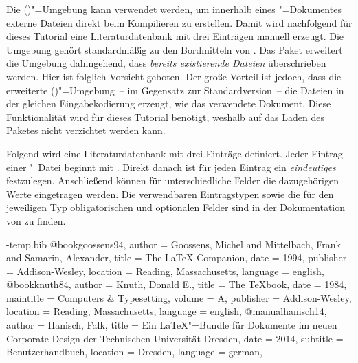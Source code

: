 \documentclass[%
  english,ngerman,%
  cdgeometry=no,DIV=12,automark,%
]{tudscrartcl}
\begin{document}
Die ()"=Umgebung kann verwendet 
werden, um innerhalb eines "=Dokumentes externe Dateien direkt 
beim Kompilieren zu erstellen. Damit wird nachfolgend für dieses Tutorial eine 
Literaturdatenbank  mit drei Einträgen manuell erzeugt. 
Die Umgebung gehört standardmäßig zu den Bordmitteln von . Das 
Paket  erweitert die Umgebung dahingehend, dass 
\emph{bereits existierende Dateien} überschrieben werden. Hier ist folglich 
Vorsicht geboten. Der große Vorteil ist jedoch, dass die erweiterte 
()"=Umgebung~-- im Gegensatz 
zur Standardversion~-- die Dateien in der gleichen Eingabekodierung erzeugt, 
wie das verwendete Dokument. Diese Funktionalität wird für dieses Tutorial 
benötigt, weshalb auf das Laden des Paketes  nicht 
verzichtet werden kann. 
%
\begin{Preamble}
\usepackage{filecontents}
\end{Preamble}
%
Folgend wird eine Literaturdatenbank mit drei Einträge definiert. Jeder Eintrag 
einer "~Datei beginnt mit . Direkt 
danach ist für jeden Eintrag ein \emph{eindeutiges}  
festzulegen. Anschließend können für unterschiedliche Felder die dazugehörigen 
Werte eingetragen werden. Die verwendbaren Eintragstypen sowie die für den 
jeweiligen Typ obligatorischen und optionalen Felder sind in der Dokumentation 
von  zu finden.
%
\begin{Preamble*}
\begin{filecontents}{\jobname-temp.bib}
@book{goossens94,
  author    = {Goossens, Michel and Mittelbach, Frank
               and Samarin, Alexander},
  title     = {The LaTeX Companion},
  date      = {1994},
  publisher = {Addison-Wesley},
  location  = {Reading, Massachusetts},
  language  = {english},
}
@book{knuth84,
  author    = {Knuth, Donald E.},
  title     = {The \TeX book},
  date      = {1984},
  maintitle = {Computers \& Typesetting},
  volume    = {A},
  publisher = {Addison-Wesley},
  location  = {Reading, Massachusetts},
  language  = {english},
}
@manual{hanisch14,
  author    = {Hanisch, Falk},
  title     = {Ein \LaTeX"=Bundle für Dokumente im neuen Corporate 
               Design der Technischen Universität Dresden},
  date      = {2014},
  subtitle  = {Benutzerhandbuch},
  location  = {Dresden},
  language  = {german},
}
\end{filecontents}
\end{Preamble*}
\end{document}
